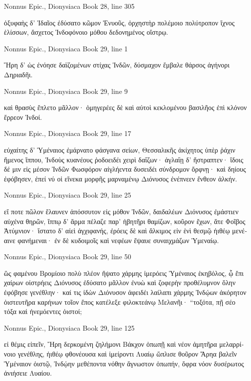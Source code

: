 \documentclass[12pt,letterpaper,twoside,final]{memoir}
\begin{document}
\begin{greek}
Nonnus Epic., Dionysiaca 
Book 28, line 305

ὀξυφαὴς δ' Ἰδαῖος ἐδύσατο κῶμον Ἐνυοῦς, 
ὀρχηστὴρ πολέμοιο πολύτροπον ἴχνος ἑλίσσων, 
ἄσχετος Ἰνδοφόνοιο μόθου δεδονημένος οἴστρῳ. 



Nonnus Epic., Dionysiaca 
Book 29, line 1

Ἥρη δ' ὡς ἐνόησε δαϊζομένων στίχας Ἰνδῶν, 
δύσμαχον ἔμβαλε θάρσος ἀγήνορι Δηριαδῆι. 



Nonnus Epic., Dionysiaca 
Book 29, line 9

καὶ θρασὺς ἔπλετο μᾶλλον· ὁμηγερέες δὲ καὶ αὐτοὶ 
κεκλομένου βασιλῆος ἐπὶ κλόνον ἔρρεον Ἰνδοί. 



Nonnus Epic., Dionysiaca 
Book 29, line 17

εὐχαίτης δ' Ὑμέναιος ἐμάρνατο φάσγανα σείων, 
Θεσσαλικῆς ἀκίχητος ὑπὲρ ῥάχιν ἥμενος ἵππου, 
Ἰνδοὺς κυανέους ῥοδοειδέι χειρὶ δαΐζων· 
ἀγλαΐῃ δ' ἤστραπτεν· ἴδοις δέ μιν εἰς μέσον Ἰνδῶν 
Φωσφόρον αἰγλήεντα δυσειδέι σύνδρομον ὄρφνῃ·   
καὶ δηίους ἐφόβησεν, ἐπεί νύ οἱ εἵνεκα μορφῆς 
μαρναμένῳ Διόνυσος ἐνέπνεεν ἔνθεον ἀλκήν. 



Nonnus Epic., Dionysiaca 
Book 29, line 25

εἴ ποτε πῶλον ἔλαυνεν ἀπόσσυτον εἰς μόθον Ἰνδῶν, 
δαιδαλέων Διόνυσος ἐμάστιεν αὐχένα θηρῶν, 
ἵππῳ δ' ἅρμα πέλαζε παρ' ἡβητῆρι θαμίζων, 
κοῦρον ἔχων, ἅτε Φοῖβος Ἀτύμνιον· ἵστατο δ' αἰεὶ 
ἀγχιφανής, ἐρόεις δὲ καὶ ἄλκιμος εἰν ἑνὶ θεσμῷ 
ἠιθέῳ μενέαινε φανήμεναι· ἐν δὲ κυδοιμοῖς 
καὶ νεφέων ἔψαυε συναιχμάζων Ὑμεναίῳ. 



Nonnus Epic., Dionysiaca 
Book 29, line 50

ὣς φαμένου Βρομίοιο πολὺ πλέον ἥψατο χάρμης 
ἱμερόεις Ὑμέναιος ἑκηβόλος, ᾧ ἔπι χαίρων 
οἰστρήεις Διόνυσος ἐδύσατο μᾶλλον ἐνυὼ 
καὶ ζοφερὴν προθέλυμνον ὅλην ἐφόβησε γενέθλην· 
καί τις ἰδὼν Διόνυσον ἀφειδέι λαίλαπι χάρμης 
Ἰνδῴων ἀκόρητον ὀιστευτῆρα καρήνων 
τοῖον ἔπος κατέλεξε φιλοκτεάνῳ Μελανῆι· 
 “τοξότα, πῇ σέο τόξα καὶ ἠνεμόεντες ὀιστοί; 



Nonnus Epic., Dionysiaca 
Book 29, line 125

                                           εἰ θέμις εἰπεῖν, 
Ἥρη δερκομένη ζηλήμονι Βάκχον ὀπωπῇ 
καὶ νέον ἀμητῆρα μελαρρίνοιο γενέθλης, 
ἠιθέῳ φθονέουσα καὶ ἱμείροντι Λυαίῳ 
ὥπλισε θοῦρον Ἄρηα βαλεῖν Ὑμέναιον ὀιστῷ, 
Ἰνδῴην μεθέποντα νόθην ἄγνωστον ὀπωπήν, 
ὄφρα νόον δυσέρωτος ἀνιήσειε Λυαίου. 




\end{greek}
\end{document}
